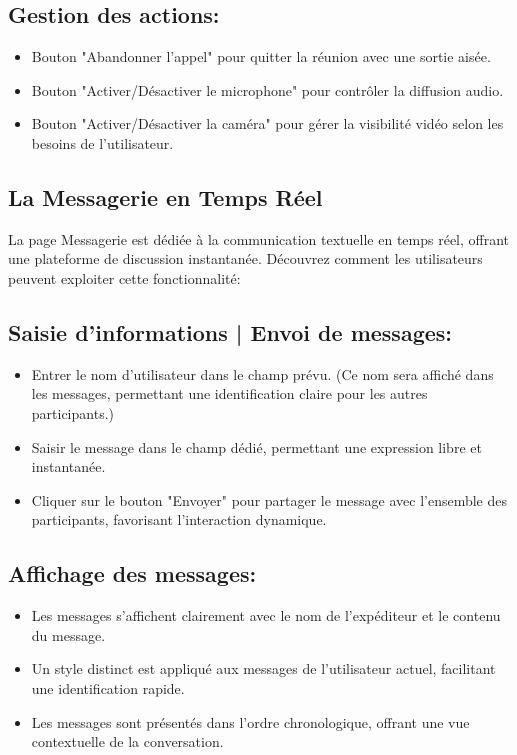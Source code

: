 \documentclass[12pt, a4paper, oneside]{article}
\begin{document}
\subsection*{Gestion des actions:}
\begin{itemize}
  \item Bouton "Abandonner l'appel" pour quitter la réunion avec une sortie aisée.
  \item Bouton "Activer/Désactiver le microphone" pour contrôler la diffusion audio.
  \item Bouton "Activer/Désactiver la caméra" pour gérer la visibilité vidéo selon les besoins de l'utilisateur.
\end{itemize}

\newpage

\subsection{La Messagerie en Temps Réel}

La page Messagerie est dédiée à la communication textuelle en temps réel, offrant une plateforme de discussion instantanée. Découvrez comment les utilisateurs peuvent exploiter cette fonctionnalité:

\subsection*{Saisie d'informations | Envoi de messages:}
\begin{itemize}
  \item Entrer le nom d'utilisateur dans le champ prévu. (Ce nom sera affiché dans les messages, permettant une identification claire pour les autres participants.)
  \item Saisir le message dans le champ dédié, permettant une expression libre et instantanée.
  \item Cliquer sur le bouton "Envoyer" pour partager le message avec l'ensemble des participants, favorisant l'interaction dynamique.
\end{itemize}

\subsection*{Affichage des messages:}
\begin{itemize}
  \item Les messages s'affichent clairement avec le nom de l'expéditeur et le contenu du message.
  \item Un style distinct est appliqué aux messages de l'utilisateur actuel, facilitant une identification rapide.
  \item Les messages sont présentés dans l'ordre chronologique, offrant une vue contextuelle de la conversation.
\end{itemize}
\end{document}
